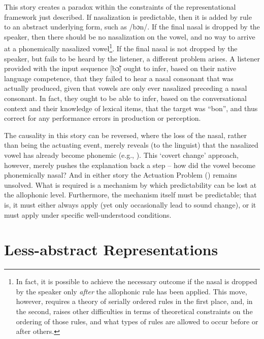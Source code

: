 This story creates a paradox within the constraints of the representational
framework just described. If nasalization is predictable, then it
is added by rule to an abstract underlying form, such as {/bɔn/}.
If the final nasal is dropped by the speaker, then there should be
no nasalization on the vowel, and no way to arrive at a phonemically
nasalized vowel\footnote{In fact, it is possible to achieve the necessary outcome if the nasal
is dropped by the speaker only \emph{after} the allophonic rule has
been applied. This move, however, requires a theory of serially ordered
rules in the first place, and, in the second, raises other difficulties
in terms of theoretical constraints on the ordering of those rules,
and what types of rules are allowed to occur before or after others.}. If the final nasal is not dropped by the speaker, but fails to be
heard by the listener, a different problem arises. A listener provided
with the input sequence {[bɔ̃]} ought to infer, based on
their native language competence, that they failed to hear a nasal
consonant that was actually produced, given that vowels are only ever
nasalized preceding a nasal consonant. In fact, they ought to be able
to infer, based on the conversational context and their knowledge
of lexical items, that the target was “bon”, and thus correct
for any performance errors in production or perception.

The causality in this story can be reversed, where the loss of the
nasal, rather than being the actuating event, merely reveals (to the
linguist) that the nasalized vowel has already become phonemic (e.g.,
\citealt{Janda2003}). This `covert change' approach, however, merely
pushes the explanation back a step – how did the vowel become phonemically
nasal? And in either story the Actuation Problem (\citealt{Labov1968})
remains unsolved. What is required is a mechanism by which predictability
can be lost at the allophonic level. Furthermore, the mechanism itself
must be predictable; that is, it must either always apply (yet only
occasionally lead to sound change), or it must apply under specific
well-understood conditions.

\section{\label{sec:Less-abstract-Representations}Less-abstract Representations}

